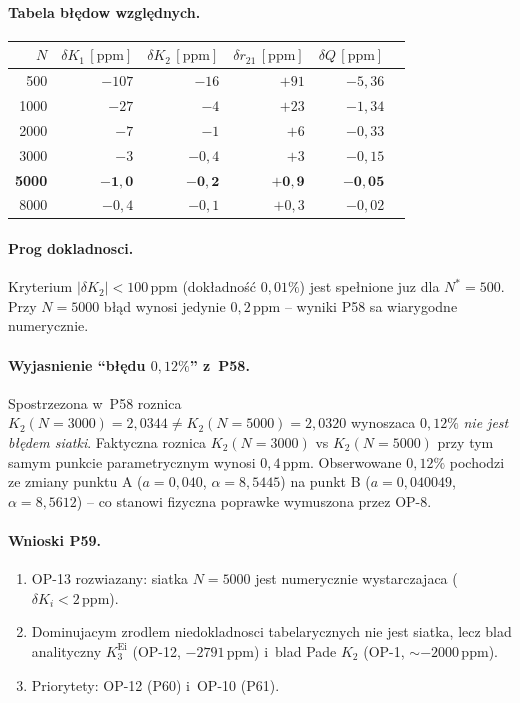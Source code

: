 \paragraph{Tabela b\l{}\k{e}dow wzgl\k{e}dnych.}
\begin{center}
\begin{tabular}{rrrrrr}
\hline
$N$ & $\delta K_1\,[\mathrm{ppm}]$ & $\delta K_2\,[\mathrm{ppm}]$
    & $\delta r_{21}\,[\mathrm{ppm}]$ & $\delta Q\,[\mathrm{ppm}]$ \\
\hline
 500 & $-107$ & $-16$ & $+91$ & $-5{,}36$ \\
1000 & $-27$  & $-4$  & $+23$ & $-1{,}34$ \\
2000 & $-7$   & $-1$  & $+6$  & $-0{,}33$ \\
3000 & $-3$   & $-0{,}4$ & $+3$  & $-0{,}15$ \\
\textbf{5000} & $\mathbf{-1{,}0}$ & $\mathbf{-0{,}2}$ & $\mathbf{+0{,}9}$ & $\mathbf{-0{,}05}$ \\
8000 & $-0{,}4$ & $-0{,}1$ & $+0{,}3$ & $-0{,}02$ \\
\hline
\end{tabular}
\end{center}

\paragraph{Prog dokladnosci.}
Kryterium $|\delta K_2|<100\,\mathrm{ppm}$ (dok\l{}adno\'s\'c $0{,}01\%$)
jest spe\l{}nione juz dla $N^*=500$.
Przy $N=5000$ b\l{}\k{a}d wynosi jedynie $0{,}2\,\mathrm{ppm}$ --
wyniki P58 sa wiarygodne numerycznie.

\paragraph{Wyjasnienie ``b\l{}\k{e}du $0{,}12\%$'' z~P58.}
Spostrzezona w~P58 roznica
$K_2(N=3000)=2{,}0344\neq K_2(N=5000)=2{,}0320$ wynoszaca $0{,}12\%$
\emph{nie jest b\l{}\k{e}dem siatki}.
Faktyczna roznica $K_2(N=3000)$ vs $K_2(N=5000)$
przy tym samym punkcie parametrycznym wynosi $0{,}4\,\mathrm{ppm}$.
Obserwowane $0{,}12\%$ pochodzi ze zmiany punktu
A ($a=0{,}040$, $\alpha=8{,}5445$) na punkt
B ($a=0{,}040049$, $\alpha=8{,}5612$) -- co stanowi
fizyczna poprawke wymuszona przez OP-8.

\paragraph{Wnioski P59.}
\begin{enumerate}
  \item OP-13 rozwiazany: siatka $N=5000$ jest numerycznie wystarczajaca
        ($\delta K_i<2\,\mathrm{ppm}$).
  \item Dominujacym zrodlem niedokladnosci tabelarycznych nie jest siatka,
        lecz blad analityczny $K_3^{\mathrm{Ei}}$ (OP-12, $-2791\,\mathrm{ppm}$)
        i~blad Pade $K_2$ (OP-1, $\sim-2000\,\mathrm{ppm}$).
  \item Priorytety: OP-12 (P60) i~OP-10 (P61).
\end{enumerate}

